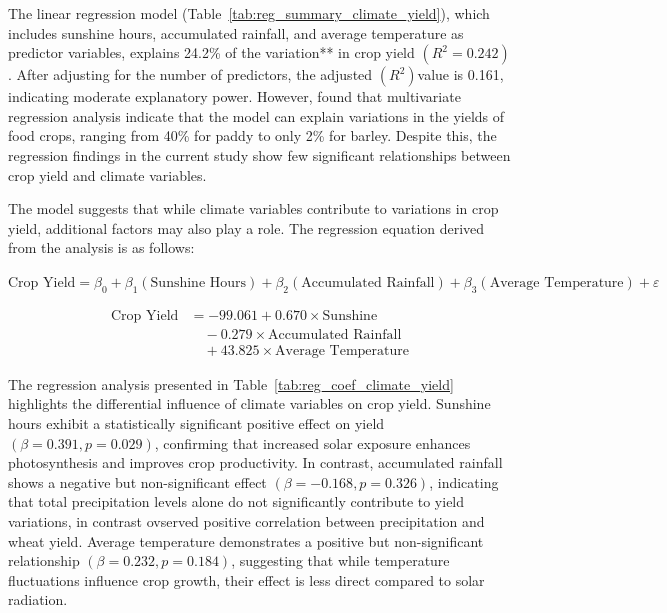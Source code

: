 The linear regression model (Table~\ref{tab:reg_summary_climate_yield}), which includes sunshine hours, accumulated rainfall, and average temperature as predictor variables, explains 24.2\% of the variation** in crop yield $(R^2 = 0.242)$. After adjusting for the number of predictors, the adjusted $(R^2) $value is 0.161, indicating moderate explanatory power. However, \textcite{maharjanEffectClimateVariables2013} found that multivariate regression analysis indicate that the model can explain variations in the yields of food crops, ranging from 40\% for paddy to only 2\% for barley. Despite this, the regression findings in the current study show few significant relationships between crop yield and climate variables.

The model suggests that while climate variables contribute to variations in crop yield, additional factors may also play a role. The regression equation derived from the analysis is as follows:  

$
\text{Crop Yield} = \beta_0 + \beta_1 (\text{Sunshine Hours}) + \beta_2 (\text{Accumulated Rainfall}) + \beta_3 (\text{Average Temperature}) + \varepsilon
$

\begin{equation}
    \begin{split}
        \text{Crop Yield} &= -99.061 + 0.670 \times \text{Sunshine} \\
        &\quad - 0.279 \times \text{Accumulated Rainfall} \\
        &\quad + 43.825 \times \text{Average Temperature}
    \end{split}
\end{equation}

The regression analysis presented in Table~\ref{tab:reg_coef_climate_yield} highlights the differential influence of climate variables on crop yield. Sunshine hours exhibit a statistically significant positive effect on yield $(\beta = 0.391, p = 0.029)$, confirming that increased solar exposure enhances photosynthesis and improves crop productivity. In contrast, accumulated rainfall shows a negative but non-significant effect $(\beta = -0.168, p = 0.326)$, indicating that total precipitation levels alone do not significantly contribute to yield variations, in contrast \textcite{thapa-parajuliImpactClimateChange2016} ovserved positive correlation between precipitation and wheat yield. Average temperature demonstrates a positive but non-significant relationship $(\beta = 0.232, p = 0.184)$, suggesting that while temperature fluctuations influence crop growth, their effect is less direct compared to solar radiation.


